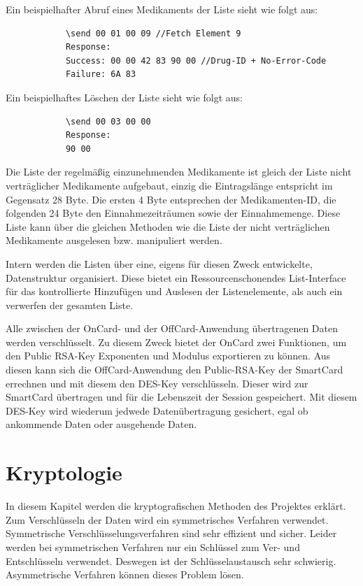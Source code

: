 \documentclass[parskip]{scrartcl}
\begin{document}
		Ein beispielhafter Abruf eines Medikaments der Liste sieht wie folgt aus:
		
		\begin{lstlisting}
			\send 00 01 00 09 //Fetch Element 9
			Response:
			Success: 00 00 42 83 90 00 //Drug-ID + No-Error-Code
			Failure: 6A 83
		\end{lstlisting}
		
		Ein beispielhaftes Löschen der Liste sieht wie folgt aus:
			
		\begin{lstlisting}
			\send 00 03 00 00
			Response:
			90 00
		\end{lstlisting}
		
		Die Liste der regelmäßig einzunehmenden Medikamente ist gleich der Liste nicht verträg\-licher Medikamente aufgebaut, einzig die Eintragslänge entspricht im Gegensatz 28 Byte. Die ersten 4 Byte entsprechen der Medikamenten-ID, die folgenden 24 Byte den Einnahmezeiträumen sowie der Einnahmemenge. Diese Liste kann über die gleichen Methoden wie die Liste der nicht verträglichen Medikamente ausgelesen bzw. manipuliert werden.
		
		Intern werden die Listen über eine, eigens für diesen Zweck entwickelte, Datenstruktur organisiert. Diese bietet ein Ressourcenschonendes List-Interface für das kontrollierte Hinzufügen und Auslesen der Listenelemente, als auch ein verwerfen der gesamten Liste.
		
		Alle zwischen der OnCard- und der OffCard-Anwendung übertragenen Daten werden verschlüsselt. Zu diesem Zweck bietet der OnCard zwei Funktionen, um den Public RSA-Key Exponenten und Modulus exportieren zu können. Aus diesen kann sich die OffCard-Anwendung den Public-RSA-Key der SmartCard errechnen und mit diesem den DES-Key verschlüsseln. Dieser wird zur SmartCard übertragen und für die Lebenszeit der Session gespeichert. Mit diesem DES-Key wird wiederum jedwede Datenübertragung gesichert, egal ob ankommende Daten oder ausgehende Daten.
	\section{Kryptologie}
		In diesem Kapitel werden die kryptografischen Methoden des Projektes erklärt. Zum Verschlüsseln der Daten wird ein symmetrisches Verfahren verwendet. Symmetrische Verschlüsselungsverfahren sind sehr effizient und sicher. Leider werden bei symmet\-rischen Verfahren nur ein Schlüssel zum Ver- und Entschlüsseln verwendet. Deswegen ist der Schlüsselaustausch sehr schwierig. Asymmetrische Verfahren können dieses Problem lösen.
\end{document}
